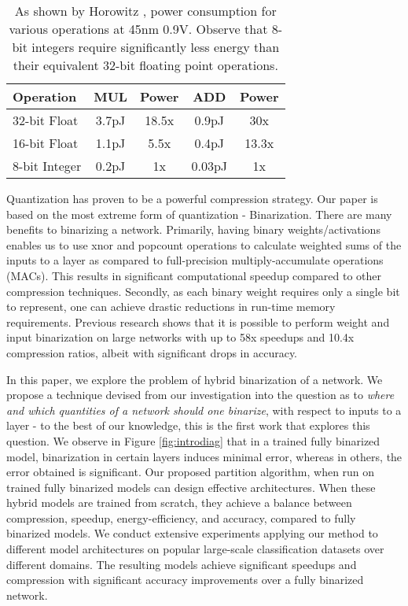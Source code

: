 \documentclass[10pt,twocolumn,letterpaper]{article}
\begin{document}
\begin{table}[t]
\begin{center}
\begin{tabular}{|l|c|c|c|c|}
\hline{\bf Operation} & {\bf MUL} & {\bf Power} & {\bf ADD} & {\bf Power}\\ 
\hline
32-bit Float & 3.7pJ & 18.5x & 0.9pJ & 30x \\
16-bit Float & 1.1pJ & 5.5x & 0.4pJ &  13.3x\\
8-bit Integer & 0.2pJ & 1x & 0.03pJ & 1x \\
\hline
\end{tabular}
\end{center}
\caption{As shown by Horowitz \etal\cite{horowitz2014power}, power consumption for various operations at 45nm 0.9V. Observe that 8-bit integers require significantly less energy than their equivalent 32-bit floating point operations.}
\label{table:mac-energy}
\end{table}
Quantization has proven to be a powerful compression strategy. Our paper is based on the most extreme form of quantization - Binarization. There are many benefits to binarizing a network. Primarily, having binary weights/activations enables us to use xnor and popcount operations to calculate weighted sums of the inputs to a layer as compared to full-precision multiply-accumulate operations (MACs). This results in significant computational speedup compared to other compression techniques. Secondly, as each binary weight requires only a single bit to represent, one can achieve drastic reductions in run-time memory requirements. Previous research \cite{rastegari2016xnor,hubara2016quantized} shows that it is possible to perform weight and input binarization on large networks with up to 58x speedups and 10.4x compression ratios, albeit with significant drops in accuracy.

In this paper, we explore the problem of hybrid binarization of a network. We propose a technique devised from our investigation into the question as to {\it where and which quantities of a network should one binarize}, with respect to inputs to a layer - to the best of our knowledge, this is the first work that explores this question. We observe in Figure \ref{fig:introdiag} that in a trained fully binarized model, binarization in certain layers induces minimal error, whereas in others, the error obtained is significant. Our proposed partition algorithm, when run on trained fully binarized models can design effective architectures. When these hybrid models are trained from scratch, they  achieve a balance between compression, speedup, energy-efficiency, and accuracy, compared to fully binarized models. We conduct extensive experiments applying our method to different model architectures on popular large-scale classification datasets over different domains. The resulting models achieve significant speedups and compression with significant accuracy improvements over a fully binarized network.
\end{document}
